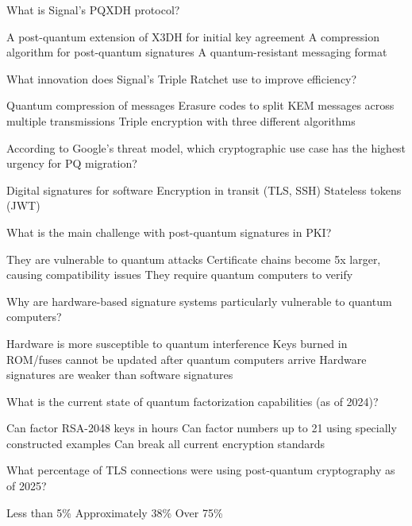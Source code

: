 \documentclass[10pt,a4paper,american]{exam}
\begin{document}
\begin{questions}
	\question What is Signal's PQXDH protocol?
	\begin{randomizechoices}
		\CorrectChoice A post-quantum extension of X3DH for initial key agreement
		\choice A compression algorithm for post-quantum signatures
		\choice A quantum-resistant messaging format
	\end{randomizechoices}

	\question What innovation does Signal's Triple Ratchet use to improve efficiency?
	\begin{randomizechoices}
		\choice Quantum compression of messages
		\CorrectChoice Erasure codes to split KEM messages across multiple transmissions
		\choice Triple encryption with three different algorithms
	\end{randomizechoices}

	\question According to Google's threat model, which cryptographic use case has the highest urgency for PQ migration?
	\begin{randomizechoices}
		\choice Digital signatures for software
		\CorrectChoice Encryption in transit (TLS, SSH)
		\choice Stateless tokens (JWT)
	\end{randomizechoices}

	\question What is the main challenge with post-quantum signatures in PKI?
	\begin{randomizechoices}
		\choice They are vulnerable to quantum attacks
		\CorrectChoice Certificate chains become 5x larger, causing compatibility issues
		\choice They require quantum computers to verify
	\end{randomizechoices}

	\question Why are hardware-based signature systems particularly vulnerable to quantum computers?
	\begin{randomizechoices}
		\choice Hardware is more susceptible to quantum interference
		\CorrectChoice Keys burned in ROM/fuses cannot be updated after quantum computers arrive
		\choice Hardware signatures are weaker than software signatures
	\end{randomizechoices}

	\question What is the current state of quantum factorization capabilities (as of 2024)?
	\begin{randomizechoices}
		\choice Can factor RSA-2048 keys in hours
		\CorrectChoice Can factor numbers up to 21 using specially constructed examples
		\choice Can break all current encryption standards
	\end{randomizechoices}

	\question What percentage of TLS connections were using post-quantum cryptography as of 2025?
	\begin{randomizechoices}
		\choice Less than 5\%
		\CorrectChoice Approximately 38\%
		\choice Over 75\%
	\end{randomizechoices}

\end{questions}

\clearpage

\end{document}
